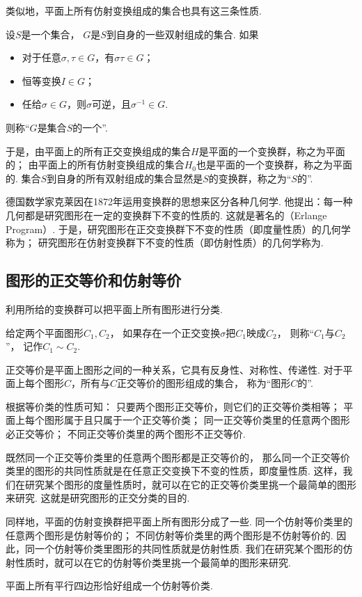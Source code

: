 类似地，平面上所有仿射变换组成的集合也具有这三条性质.
\begin{definition}
设\(S\)是一个集合，
\(G\)是\(S\)到自身的一些双射组成的集合.
如果\begin{itemize}
	\item 对于任意\(\sigma,\tau \in G\)，有\(\sigma \tau \in G\)；
	\item 恒等变换\(I \in G\)；
	\item 任给\(\sigma \in G\)，则\(\sigma\)可逆，且\(\sigma^{-1} \in G\).
\end{itemize}
则称“\(G\)是集合\(S\)的一个”.
\end{definition}

于是，由平面上的所有正交变换组成的集合\(H\)是平面的一个变换群，称之为平面的；
由平面上的所有仿射变换组成的集合\(H_0\)也是平面的一个变换群，称之为平面的.
集合\(S\)到自身的所有双射组成的集合显然是\(S\)的变换群，称之为“\(S\)的”.

德国数学家克莱因在1872年运用变换群的思想来区分各种几何学.
他提出：每一种几何都是研究图形在一定的变换群下不变的性质的.
这就是著名的（Erlange Program）.
于是，研究图形在正交变换群下不变的性质（即度量性质）的几何学称为；
研究图形在仿射变换群下不变的性质（即仿射性质）的几何学称为.

\subsection{图形的正交等价和仿射等价}
利用所给的变换群可以把平面上所有图形进行分类.
\begin{definition}
给定两个平面图形\(C_1,C_2\)，
如果存在一个正交变换\(\sigma\)把\(C_1\)映成\(C_2\)，
则称“\(C_1\)与\(C_2\) ”，
记作\(C_1 \sim C_2\).
\end{definition}

正交等价是平面上图形之间的一种关系，它具有反身性、对称性、传递性.
对于平面上每个图形\(C\)，所有与\(C\)正交等价的图形组成的集合，
称为“图形\(C\)的”.

根据等价类的性质可知：
只要两个图形正交等价，则它们的正交等价类相等；
平面上每个图形属于且只属于一个正交等价类；
同一正交等价类里的任意两个图形必正交等价；
不同正交等价类里的两个图形不正交等价.

既然同一个正交等价类里的任意两个图形都是正交等价的，
那么同一个正交等价类里的图形的共同性质就是在任意正交变换下不变的性质，即度量性质.
这样，我们在研究某个图形的度量性质时，就可以在它的正交等价类里挑一个最简单的图形来研究.
这就是研究图形的正交分类的目的.

同样地，平面的仿射变换群把平面上所有图形分成了一些.
同一个仿射等价类里的任意两个图形是仿射等价的；
不同仿射等价类里的两个图形是不仿射等价的.
因此，同一个仿射等价类里图形的共同性质就是仿射性质.
我们在研究某个图形的仿射性质时，就可以在它的仿射等价类里挑一个最简单的图形来研究.

\begin{example}
平面上所有平行四边形恰好组成一个仿射等价类.
\end{example}
